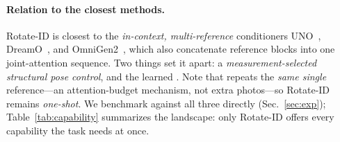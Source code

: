 \paragraph{Relation to the closest methods.} Rotate-ID is closest to the
\emph{in-context, multi-reference} conditioners UNO~\cite{uno},
DreamO~\cite{dreamo}, and OmniGen2~\cite{omnigen2}, which also concatenate
reference blocks into one joint-attention sequence. Two things set it apart:
a \emph{measurement-selected structural pose control}, and the learned
\gate{}. Note that \dupid{} repeats the \emph{same single} reference---an
attention-budget mechanism, not extra photos---so Rotate-ID remains
\emph{one-shot}. We benchmark against all three directly (Sec.~\ref{sec:exp});
Table~\ref{tab:capability} summarizes the landscape: only Rotate-ID offers
every capability the task needs at once.

